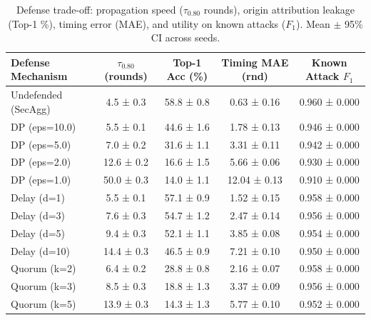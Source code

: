 \begin{table}[t]
\centering
\small
\caption{Defense trade-off: propagation speed ($\tau_{0.80}$ rounds), origin attribution leakage (Top-1 \%), timing error (MAE), and utility on known attacks ($F_1$). Mean $\pm$ 95\% CI across seeds.}
\label{tab:defenses}
\begin{tabular}{lcccc}
\toprule
Defense Mechanism & $\tau_{0.80}$ (rounds) & Top-1 Acc (\%) & Timing MAE (rnd) & Known Attack $F_1$ \\
\midrule
Undefended (SecAgg) & 4.5 ± 0.3 & 58.8 ± 0.8 & 0.63 ± 0.16 & 0.960 ± 0.000 \\
DP (eps=10.0) & 5.5 ± 0.1 & 44.6 ± 1.6 & 1.78 ± 0.13 & 0.946 ± 0.000 \\
DP (eps=5.0) & 7.0 ± 0.2 & 31.6 ± 1.1 & 3.31 ± 0.11 & 0.942 ± 0.000 \\
DP (eps=2.0) & 12.6 ± 0.2 & 16.6 ± 1.5 & 5.66 ± 0.06 & 0.930 ± 0.000 \\
DP (eps=1.0) & 50.0 ± 0.3 & 14.0 ± 1.1 & 12.04 ± 0.13 & 0.910 ± 0.000 \\
Delay (d=1) & 5.5 ± 0.1 & 57.1 ± 0.9 & 1.52 ± 0.15 & 0.958 ± 0.000 \\
Delay (d=3) & 7.6 ± 0.3 & 54.7 ± 1.2 & 2.47 ± 0.14 & 0.956 ± 0.000 \\
Delay (d=5) & 9.4 ± 0.3 & 52.1 ± 1.1 & 3.85 ± 0.08 & 0.954 ± 0.000 \\
Delay (d=10) & 14.4 ± 0.3 & 46.5 ± 0.9 & 7.21 ± 0.10 & 0.950 ± 0.000 \\
Quorum (k=2) & 6.4 ± 0.2 & 28.8 ± 0.8 & 2.16 ± 0.07 & 0.958 ± 0.000 \\
Quorum (k=3) & 8.5 ± 0.3 & 18.8 ± 1.3 & 3.37 ± 0.09 & 0.956 ± 0.000 \\
Quorum (k=5) & 13.9 ± 0.3 & 14.3 ± 1.3 & 5.77 ± 0.10 & 0.952 ± 0.000 \\
\bottomrule
\end{tabular}
\end{table}
